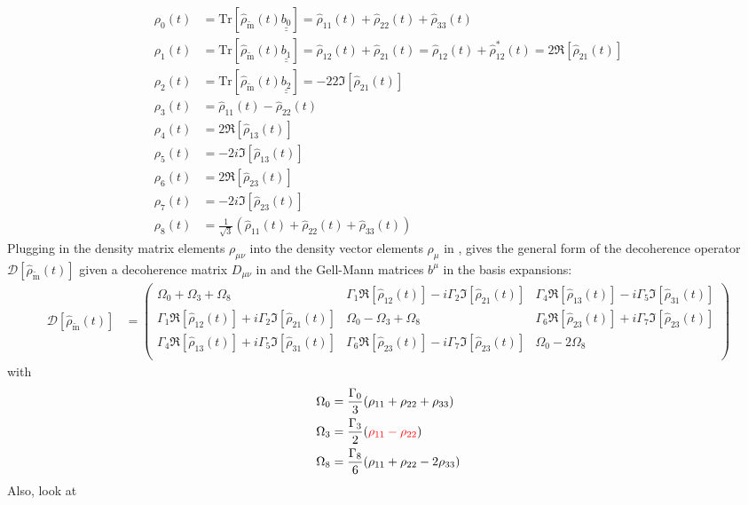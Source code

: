 %
\begin{align}  \label{eq:density_matrix_0}
    \rho_0(t) &= \text{Tr}[\hat{\rho}_{\tilde{\text{m}}}(t) \underline{\underline{b_0}}] = \hat{\rho}_{11}(t)+ \hat{\rho}_{22}(t) + \hat{\rho}_{33}(t) \\
    \rho_1(t) &= \text{Tr}[\hat{\rho}_{\tilde{\text{m}}}(t) \underline{\underline{b_1}}] = \hat{\rho}_{12}(t)+ \hat{\rho}_{21}(t) = \hat{\rho}_{12}(t) + \hat{\rho}^*_{12}(t) = 2\Re[\hat{\rho}_{21}(t)] \\
   \rho_2(t) &= \text{Tr}[\hat{\rho}_{\tilde{\text{m}}}(t) \underline{\underline{b_2}}] = -2 2\Im[\hat{\rho}_{21}(t)] \\
   \rho_3(t) &= \hat{\rho}_{11}(t) - \hat{\rho}_{22}(t) \\
   \rho_4(t) &= 2\Re[\hat{\rho}_{13}(t)] \\
   \rho_5(t) &= -2i \Im[\hat{\rho}_{13}(t)] \\
   \rho_6(t) &= 2\Re[\hat{\rho}_{23}(t)] \\
   \rho_7(t) &= -2i \Im[\hat{\rho}_{23}(t)] \\
   \rho_8(t) &= \frac{1}{\sqrt{3}} \left( \hat{\rho}_{11}(t) + \hat{\rho}_{22}(t) + \hat{\rho}_{33}(t) \right)
\end{align}
%
Plugging in the density matrix elements $\rho_{\mu\nu}$ into the density vector elements $\rho_\mu$ in , gives the general form of the decoherence operator $\mathcal{D}[\hat{\rho}_{\tilde{\text{m}}}(t)]$ given a decoherence matrix $D_{\mu\nu}$ in  and the Gell-Mann matrices $b^\mu$ in the basis expansions:
%
\begin{align} \label{eq:deco_operator_general}
   \mathcal{D}[\hat{\rho}_{\tilde{\text{m}}}(t)]
   &=
    \begin{pmatrix}
        \Omega_0 + \Omega_3 + \Omega_8 & \Gamma_1 \Re[\hat{\rho}_{12}(t)] - i \Gamma_2 \Im[\hat{\rho}_{21}(t)] & \Gamma_4 \Re[\hat{\rho}_{13}(t)] - i \Gamma_5 \Im[\hat{\rho}_{31}(t)] \\
        \Gamma_1 \Re[\hat{\rho}_{12}(t)] + i \Gamma_2 \Im[\hat{\rho}_{21}(t)] & \Omega_0 - \Omega_3 + \Omega_8  & \Gamma_6 \Re[\hat{\rho}_{23}(t)] + i \Gamma_7 \Im[\hat{\rho}_{23}(t)] \\
        \Gamma_4 \Re[\hat{\rho}_{13}(t)] + i \Gamma_5 \Im[\hat{\rho}_{31}(t)] & \Gamma_6 \Re[\hat{\rho}_{23}(t)] - i \Gamma_7 \Im[\hat{\rho}_{23}(t)] & \Omega_0 - 2\Omega_8 \\
    \end{pmatrix}
\end{align}
%
with
%
\begin{align} \label{eq:Omegas}
    \Omega_0 &= \frac{\Gamma_0}{3} ( \rho_{11} + \rho_{22} + \rho_{33} ) \\
    \Omega_3 &= \frac{\Gamma_3}{2} ( \textcolor{red}{\rho_{11} - \rho_{22}} ) \\
    \Omega_8 &= \frac{\Gamma_8}{6}  ( \rho_{11} + \rho_{22} - 2\rho_{33} )
\end{align}
%
Also, look at \cite{Hellmann:2022cgt}

